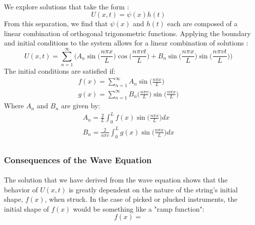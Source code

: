 \documentclass[12pt,letterpaper]{article}
\begin{document}
\paragraph*{}We explore solutions that take the form \cite{Haberman}:
\begin{equation}
U(x,t) = \psi(x)h(t)
\end{equation}
From this separation, we find that $\psi(x)$ and $h(t)$ each are composed of a linear combination of orthogonal trigonometric functions. Applying the boundary and initial conditions to the system allows for a linear combination of solutions \cite{Haberman}:
\begin{equation}
U(x,t) = 
\sum_{n=1}^{\infty} \bigg( A_n \sin\big(\frac{n\pi x}{L}\big)\cos\big(\frac{n\pi vt}{L}\big)
+ B_n \sin\big(\frac{n\pi x}{L}\big)\sin\big(\frac{n\pi vt}{L}\big) \bigg)
\end{equation}
The initial conditions are satisfied if:
\begin{equation}
\begin{array}{ll}
    f(x) = \sum_{n=1}^{\infty} A_n \sin\big(\frac{n\pi x}{L}\big) \\
    g(x) = \sum_{n=1}^{\infty} B_n\big(\frac{n\pi v}{L}\big)
    			\sin\big(\frac{n\pi x}{L}\big)
\end{array} 
\end{equation}
Where $A_n$ and $B_n$ are given by:
\begin{equation}
\begin{array}{ll}
    A_n = \frac{2}{L} \int_{0}^{L} f(x) \sin\big(\frac{n\pi x}{L}\big) dx \\
    B_n = \frac{2}{n\pi v} \int_{0}^{L} g(x) \sin\big(\frac{n\pi x}{L}\big) dx \\
\end{array} 
\end{equation} 

\subsubsection{Consequences of the Wave Equation}

\paragraph*{}The solution that we have derived from the wave equation shows that the behavior of $U(x,t)$ is greatly dependent on the nature of the string's initial shape, $f(x)$, when struck. In the case of picked or plucked instruments, the initial shape of $f(x)$ would be something like a "ramp function":
\begin{equation}
\label{eqn-RampFunc}
f(x) =
\end{equation}
\end{document}
